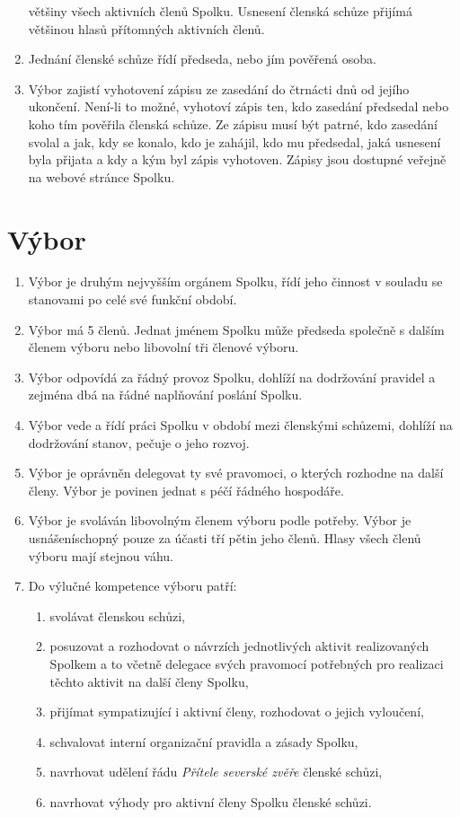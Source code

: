 \documentclass[11pt,a4paper]{article}
\begin{document}
\begin{enumerate}[itemsep=0pt]
    většiny všech aktivních členů Spolku. Usnesení členská schůze přijímá 
    většinou hlasů přítomných aktivních členů. 
    \item Jednání členské schůze řídí předseda, nebo jím pověřená osoba.
    \item Výbor zajistí vyhotovení zápisu ze zasedání do čtrnácti dnů od jejího 
    ukončení. Není-li to možné, vyhotoví zápis ten, kdo zasedání předsedal nebo 
    koho tím pověřila členská schůze. Ze zápisu musí být patrné, kdo zasedání 
    svolal a jak, kdy se konalo, kdo je zahájil, kdo mu předsedal, jaká usnesení
    byla přijata a kdy a kým byl zápis vyhotoven. Zápisy jsou dostupné veřejně 
    na webové stránce Spolku.
\end{enumerate}

\section{Výbor}
\begin{enumerate}[itemsep=0pt]
    \item Výbor je druhým nejvyšším orgánem Spolku, řídí jeho činnost v souladu 
    se stanovami po celé své funkční období. 
    \item Výbor má 5 členů. Jednat jménem Spolku může 
    předseda společně s dalším členem výboru nebo libovolní tři členové výboru.
    \item Výbor odpovídá za řádný provoz Spolku, dohlíží na dodržování pravidel 
    a zejména dbá na řádné naplňování poslání Spolku.
    \item Výbor vede a řídí práci Spolku v období mezi členskými schůzemi, 
    dohlíží na dodržování stanov, pečuje o jeho rozvoj.
    \item Výbor je oprávněn delegovat ty své pravomoci, o kterých rozhodne na 
    další členy. Výbor je povinen jednat s péčí řádného hospodáře. 
    \item Výbor je svoláván libovolným členem výboru podle potřeby. Výbor je 
    usnášeníschopný pouze za účasti tří pětin jeho členů. Hlasy všech členů 
    výboru mají stejnou váhu.
    \item Do výlučné kompetence výboru patří: 
    \begin{enumerate}[itemsep=0pt,topsep=0pt]
        \item svolávat členskou schůzi, 
        \item posuzovat a rozhodovat o návrzích jednotlivých aktivit 
        realizovaných Spolkem a to včetně delegace svých pravomocí potřebných 
        pro realizaci těchto aktivit na další členy Spolku,
        \item přijímat sympatizující i aktivní členy, rozhodovat o jejich 
        vyloučení,
        \item schvalovat interní organizační pravidla a zásady Spolku,
        \item navrhovat udělení řádu \textit{Přítele severské zvěře} členské schůzi,
        \item navrhovat výhody pro aktivní členy Spolku členské schůzi.
    \end{enumerate}
\end{enumerate}
\end{document}
